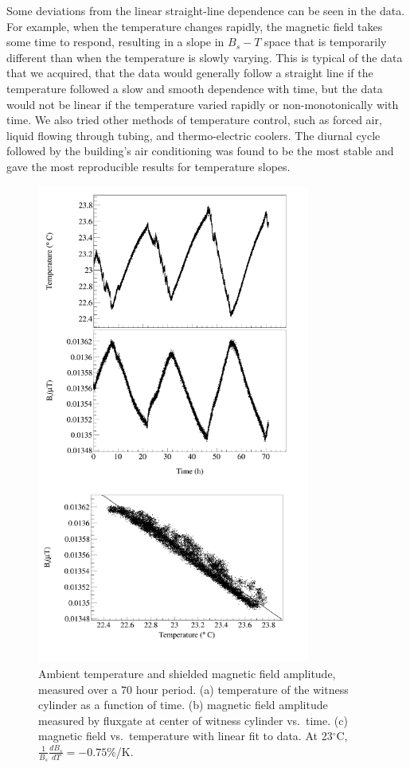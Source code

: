 Some deviations from the linear straight-line dependence can be seen
in the data.  For example, when the temperature changes rapidly, the
magnetic field takes some time to respond, resulting in a slope in
$B_s-T$ space that is temporarily different than when the temperature
is slowly varying.  This is typical of the data that we acquired, that
the data would generally follow a straight line if the temperature
followed a slow and smooth dependence with time, but the data would
not be linear if the temperature varied rapidly or non-monotonically
with time.  We also tried other methods of temperature control, such
as forced air, liquid flowing through tubing, and thermo-electric
coolers.  The diurnal cycle followed by the building's air
conditioning was found to be the most stable and gave the most
reproducible results for temperature slopes.

\begin{figure}
  \begin{center}
    \includegraphics[width=0.8\textwidth]{Axial_graph-crop.pdf}
    \caption{Ambient temperature and shielded magnetic field
      amplitude, measured over a 70 hour period. (a) temperature of
      the witness cylinder as a function of time.  (b) magnetic field
      amplitude measured by fluxgate at center of witness cylinder
      vs.~time.  (c) magnetic field vs.~temperature with linear fit to
      data. At 23$^\circ$C, $\frac{1}{B_s}\frac{dB_s}{dT}=-0.75\%$/K.}
    \label{fig:B_vs_Temp}
  \end{center}
\end{figure} 

